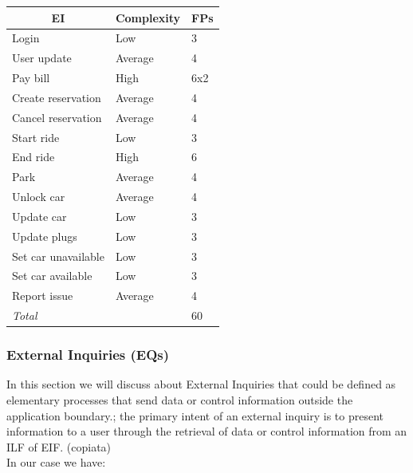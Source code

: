 \documentclass[english]{article}
\begin{document}
	\begin{center}
	\begin{tabular}{ |p{8cm}|m{2cm}|p{1cm}| }
		\hline
		\multicolumn{1}{|c|}{\textbf{EI}} & \multicolumn{1}{c|}{\textbf{Complexity}} & \multicolumn{1}{c|}{\textbf{FPs}} \\
		\hline
		Login & Low & 3 \\
		\hline
		User update & Average & 4\\
		\hline
		Pay bill & High & 6x2\\
		\hline
		Create reservation & Average & 4\\
		\hline
		Cancel reservation & Average & 4\\
		\hline
		Start ride & Low & 3\\
		\hline
		End ride & High & 6\\
		\hline
		Park & Average & 4\\
		\hline
		Unlock car & Average & 4\\
		\hline
		Update car & Low & 3\\
		\hline
		Update plugs & Low & 3\\
		\hline
		Set car unavailable & Low & 3\\
		\hline
		Set car available & Low & 3\\
		\hline
		Report issue & Average & 4\\
		\hline
		\multicolumn{2}{|l|}{\textit{Total}} & \multicolumn{1}{l|}{60}\\
		\hline
	\end{tabular}
\end{center}

\subsubsection{External Inquiries (EQs)}

In this section we will discuss about External Inquiries that could be defined as elementary processes that send data or control information outside the application boundary.; the primary intent of an external inquiry is to present information to a user through the retrieval of data or control information from an ILF of EIF. (copiata)\\
In our case we have: 
\end{document}
